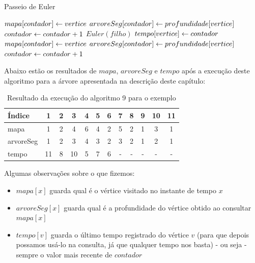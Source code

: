 \begin{algorithm}[H]
\caption{Passeio de Euler}
\begin{algorithmic}[1]
        \State $mapa[contador] \leftarrow vertice$
        \State $arvoreSeg[contador] \leftarrow profundidade[vertice]$
        \State $contador \leftarrow contador + 1$
        \State $Euler(filho)$
    \EndFor
    \State $tempo[vertice] \leftarrow contador$
    \State $mapa[contador] \leftarrow vertice$
    \State $arvoreSeg[contador] \leftarrow profundidade[vertice]$
    \State $contador \leftarrow contador + 1$
\EndFunction
\end{algorithmic}
\end{algorithm}

\vspace{10cm}

Abaixo estão os resultados de $mapa$, $arvoreSeg$ e $tempo$ após a execução deste algoritmo para a árvore apresentada na descrição deste capítulo:

\begin{table}[htb]
\centering
\begin{tabular}{|l|c|c|c|c|c|c|c|c|c|c|c|}
\hline
Índice      &  1 & 2 &  3 & 4 & 5 & 6 & 7 & 8 & 9 & 10 & 11 \\ \hline
mapa        &  1 & 2 &  4 & 6 & 4 & 2 & 5 & 2 & 1 &  3 &  1 \\ \hline
arvoreSeg   &  1 & 2 &  3 & 4 & 3 & 2 & 3 & 2 & 1 &  2 &  1 \\ \hline
tempo       & 11 & 8 & 10 & 5 & 7 & 6 & - & - & - &  - &  - \\ \hline

\end{tabular}
\caption{Resultado da execução do algoritmo 9 para o exemplo}
\end{table}

Algumas observações sobre o que fizemos:

\begin{itemize}
    \item $mapa[x]$ guarda qual é o vértice visitado no instante de tempo $x$
    \item $arvoreSeg[x]$ guarda qual é a profundidade do vértice obtido ao consultar $mapa[x]$
    \item $tempo[v]$ guarda o último tempo registrado do vértice $v$ (para que depois possamos usá-lo na consulta, já que qualquer tempo nos basta) - ou seja - sempre o valor mais recente de $contador$
\end{itemize}


